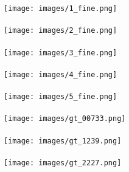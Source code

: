 \documentclass[sigconf]{acmart}
\begin{document}
\begin{figure*}[!htb]
{\begin{minipage}[b]{0.18\textwidth}
			\texttt{[image: images/1\_fine.png]}\\
			\vspace{-0.3cm}\\
			\texttt{[image: images/2\_fine.png]}\\
			\vspace{-0.3cm}\\
			\texttt{[image: images/3\_fine.png]}\\
			\vspace{-0.3cm}\\
			\texttt{[image: images/4\_fine.png]}\\
			\vspace{-0.3cm}\\
			\texttt{[image: images/5\_fine.png]}\\
			\vspace{-0.3cm}\\
			\texttt{[image: images/gt\_00733.png]}\\
			\vspace{-0.3cm}\\
			\texttt{[image: images/gt\_1239.png]}\\
			\vspace{-0.3cm}\\
			\texttt{[image: images/gt\_2227.png]}\\
			\vspace{-0.9cm}\\
		\end{minipage}
	}
\end{figure*}
\end{document}
